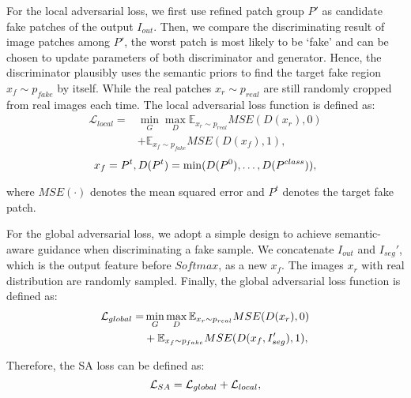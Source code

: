 \documentclass[10pt,twocolumn,letterpaper]{article}
\begin{document}
For the local adversarial loss, we first use refined patch group $P'$ as candidate fake patches of the output $I_{out}$. Then, we compare the discriminating result of image patches among $P'$, the worst patch is most likely to be ‘fake’ and can be chosen to update parameters of both discriminator and generator. Hence, the discriminator plausibly uses the semantic priors to find the target fake region $x_f\mathit{\sim} p_{fake}$ by itself. While the real patches $x_r \mathit{\sim} p_{real}$ are still randomly cropped from real images each time. The local adversarial loss function is defined as:
\vspace{-0.1cm}
\begin{equation}
\begin{split}
  \mathcal{L}_{local} = &\min\limits_G \max\limits_D\mathbb{E}_{x_r\sim p_{real}} MSE(D(x_r),0) \\
  &+ \mathbb{E}_{x_f\sim p_{fake}} MSE(D(x_f),1), 
  \label{eq:saloss1}
\end{split}
\end{equation}
\vspace{-0.1cm}
\begin{equation}
  x_f = P^t, D(P^t)=\min(D(P^0), \dotsc, D(P^{class})),
  \label{eq:saloss2}
  \vspace{-0.1cm}
\end{equation}

where $MSE(\cdot)$ denotes the mean squared error and $P^t$ denotes the target fake patch.

For the global adversarial loss, we adopt a simple design to achieve semantic-aware guidance when discriminating a fake sample. We concatenate $I_{out}$ and $I_{seg}'$, which is the output feature before $Softmax$, as a new $x_f$. The images $x_r$ with real distribution are randomly sampled. Finally, the global adversarial loss function is defined as:
\vspace{-0.1cm}
\begin{equation}
\begin{split}
  \mathcal{L}_{global} = &\min\limits_G \max\limits_D\mathbb{E}_{x_r\sim p_{real}} MSE(D(x_r),0) \\
  &+ \mathbb{E}_{x_f\sim p_{fake}} MSE(D(x_f, I_{seg}'),1), 
  \label{eq:saloss3}
  \vspace{-0.1cm}
\end{split}
\end{equation}

Therefore, the SA loss can be defined as:
\vspace{-0.1cm}
\begin{equation}
  \mathcal{L}_{SA}=\mathcal{L}_{global} + \mathcal{L}_{local},
  \label{eq:saloss4}
  \vspace{-0.1cm}
\end{equation}
\end{document}
